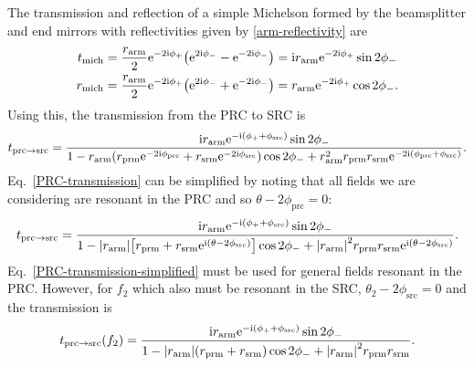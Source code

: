 \documentclass[12pt]{article}
\newcommand{\mr}[1]{\mathrm{#1}}
\newcommand{\e}{\mr{e}}
\renewcommand{\i}{\mr{i}}
\newcommand{\abs}[1]{\left|#1\right|}
\let\originalleft\left
\let\originalright\right
\renewcommand{\left}{\mathopen{}\mathclose\bgroup\originalleft}
\renewcommand{\right}{\aftergroup\egroup\originalright}
\begin{document}
The transmission and reflection of a simple Michelson formed by the beamsplitter and end mirrors with reflectivities given by \eqref{arm-reflectivity} are
\begin{align}
t_\mr{mich} &= \frac{r_\mr{arm}}{2} \e^{-2\i\phi_+}\left( \e^{2\i\phi_-} - \e^{-2\i\phi_-}\right)
= \i r_\mr{arm} \e^{-2\i\phi_+} \sin 2\phi_- \\
r_\mr{mich} &= \frac{r_\mr{arm}}{2} \e^{-2\i\phi_+}\left( \e^{2\i\phi_-} + \e^{-2\i\phi_-}\right)
= r_\mr{arm} \e^{-2\i\phi_+} \cos 2\phi_-.
\end{align}
Using this, the transmission from the PRC to SRC is
\begin{equation}
t_{\mr{prc}\to\mr{src}} = \frac{\i r_\mr{arm} \e^{-\i(\phi_+ + \phi_\mr{src})} \sin 2\phi_-}
{1 - r_\mr{arm} \left( r_\mr{prm} \e^{-2\i\phi_\mr{prc}} + r_\mr{srm} \e^{-2\i\phi_\mr{src}} \right) \cos 2\phi_-
+ r_\mr{arm}^2 r_\mr{prm} r_\mr{srm} \e^{-2\i (\phi_\mr{prc} + \phi_\mr{src})}}.
\label{PRC-transmission}
\end{equation}
Eq.~\eqref{PRC-transmission} can be simplified by noting that all fields we are considering are resonant in the PRC and so $\theta - 2\phi_\mr{prc} = 0$:
\begin{equation}
t_{\mr{prc}\to\mr{src}} = \frac{\i r_\mr{arm} \e^{-\i(\phi_+ + \phi_\mr{src})} \sin 2\phi_-}
{1 - \abs{r_\mr{arm}} \left[ r_\mr{prm} + r_\mr{srm} \e^{\i(\theta -2\phi_\mr{src})} \right] \cos 2\phi_-
+  \abs{r_\mr{arm}}^2 r_\mr{prm} r_\mr{srm} \e^{\i(\theta - 2\phi_\mr{src})}}.
\label{PRC-transmission-simplified}
\end{equation}
Eq.~\eqref{PRC-transmission-simplified} must be used for general fields resonant in the PRC. However, for $f_2$ which also must be resonant in the SRC, $\theta_2 - 2\phi_\mr{src} = 0$ and the transmission is
\begin{equation}
t_{\mr{prc}\to\mr{src}}(f_2) = \frac{\i r_\mr{arm} \e^{-\i(\phi_+ + \phi_\mr{src})} \sin 2\phi_-}
{1 - \abs{r_\mr{arm}} \left( r_\mr{prm} + r_\mr{srm} \right) \cos 2\phi_-
+  \abs{r_\mr{arm}}^2 r_\mr{prm} r_\mr{srm}}.
\label{PRC-transmission-f2}
\end{equation}
\end{document}
